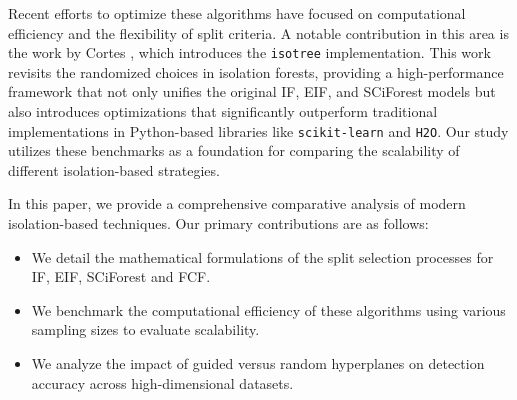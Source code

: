 Recent efforts to optimize these algorithms have focused on computational efficiency and the flexibility of split criteria. A notable contribution in this area is the work by Cortes \cite{cortes2021revisiting}, which introduces the \texttt{isotree}\cite{cortes2023package} implementation. This work revisits the randomized choices in isolation forests, providing a high-performance framework that not only unifies the original IF, EIF, and SCiForest models but also introduces optimizations that significantly outperform traditional implementations in Python-based libraries like \texttt{scikit-learn} and \texttt{H2O}. Our study utilizes these benchmarks as a foundation for comparing the scalability of different isolation-based strategies.

In this paper, we provide a comprehensive comparative analysis of modern isolation-based techniques. Our primary contributions are as follows:
\begin{itemize}
    \item We detail the mathematical formulations of the split selection processes for IF, EIF, SCiForest and FCF.
    \item We benchmark the computational efficiency of these algorithms using various sampling sizes to evaluate scalability.
    \item We analyze the impact of guided versus random hyperplanes on detection accuracy across high-dimensional datasets.
\end{itemize}
